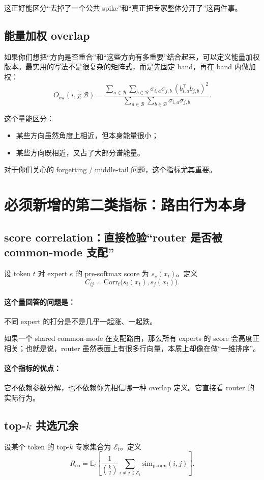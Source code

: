 \documentclass[11pt]{article}
\begin{document}
这正好能区分“去掉了一个公共 spike”和“真正把专家整体分开了”这两件事。

\subsection{能量加权 overlap}
如果你们想把“方向是否重合”和“这些方向有多重要”结合起来，可以定义能量加权版本。最实用的写法不是很复杂的矩阵式，而是先固定 band，再在 band 内做加权：
\[
    O_{\mathrm{ew}}(i,j;\mathcal B)=
    \frac{\sum_{a\in\mathcal B}\sum_{b\in\mathcal B} \sigma_{i,a}\sigma_{j,b}\,(b_{i,a}^\top b_{j,b})^2}
    {\sum_{a\in\mathcal B}\sum_{b\in\mathcal B}\sigma_{i,a}\sigma_{j,b}}.
\]

这个量能区分：
\begin{itemize}
    \item 某些方向虽然角度上相近，但本身能量很小；
    \item 某些方向既相近，又占了大部分谱能量。
\end{itemize}

对于你们关心的 forgetting / middle-tail 问题，这个指标尤其重要。

\section{必须新增的第二类指标：路由行为本身}

\subsection{score correlation：直接检验“router 是否被 common-mode 支配”}
设 token $t$ 对 expert $e$ 的 pre-softmax score 为 $s_e(x_t)$。定义
\[
    C_{ij}=\mathrm{Corr}_t\bigl(s_i(x_t),s_j(x_t)\bigr).
\]

\paragraph{这个量回答的问题是：}
不同 expert 的打分是不是几乎一起涨、一起跌。

如果一个 shared common-mode 在支配路由，那么所有 experts 的 score 会高度正相关；也就是说，router 虽然表面上有很多行向量，本质上却像在做“一维排序”。

\paragraph{这个指标的优点：}
它不依赖参数分解，也不依赖你先相信哪一种 overlap 定义。它直接看 router 的实际行为。

\subsection{top-$k$ 共选冗余}
设某个 token 的 top-$k$ 专家集合为 $\mathcal E_t$。定义
\[
    R_{\mathrm{co}}=\mathbb E_t\left[\frac{1}{\binom{k}{2}}
    \sum_{i\neq j\in \mathcal E_t} \mathrm{sim}_{\mathrm{param}}(i,j)\right].
\]
\end{document}
